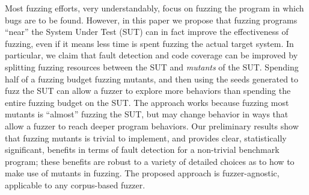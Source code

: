 Most fuzzing efforts, very understandably, focus on fuzzing the program
in which bugs are to be found.  However, in this paper we propose that
fuzzing programs ``near'' the System Under Test (SUT) can in fact
improve the effectiveness of fuzzing, even if it means less time is
spent fuzzing the actual target system.  In particular, we claim that
fault detection and code coverage can be improved by splitting fuzzing
resources between the SUT and \emph{mutants} of the SUT.  Spending
half of a fuzzing budget fuzzing mutants, and then using the seeds
generated to fuzz the SUT can allow a fuzzer to explore more behaviors
than spending the entire fuzzing budget on the SUT.  The approach
works because fuzzing most mutants is ``almost'' fuzzing the SUT, but
may change behavior in ways that allow a fuzzer to reach deeper
program behaviors.  Our preliminary results show that fuzzing mutants
is trivial to implement, and provides clear, statistically significant, benefits in terms of fault
detection for a non-trivial benchmark program; these benefits are
robust to a variety of detailed choices as to how to make use of
mutants in fuzzing.  The proposed approach is fuzzer-agnostic, applicable to any corpus-based fuzzer.
